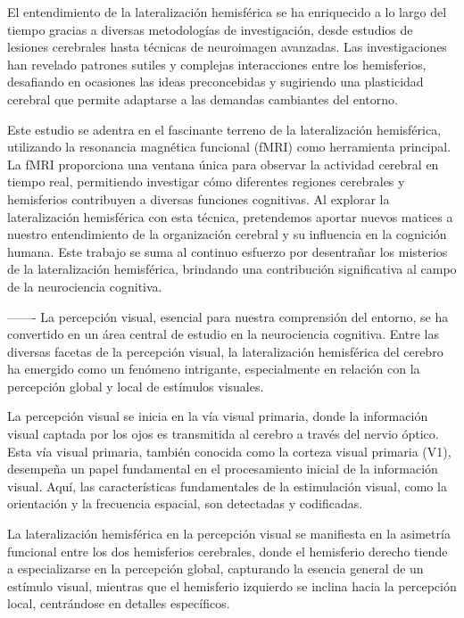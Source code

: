 \documentclass[12pt,oneside]{uhthesis}
\begin{document}
El entendimiento de la lateralización hemisférica se ha enriquecido a lo largo del tiempo gracias a diversas metodologías de investigación, desde estudios de lesiones cerebrales hasta técnicas de neuroimagen avanzadas. Las investigaciones han revelado patrones sutiles y complejas interacciones entre los hemisferios, desafiando en ocasiones las ideas preconcebidas y sugiriendo una plasticidad cerebral que permite adaptarse a las demandas cambiantes del entorno.

Este estudio se adentra en el fascinante terreno de la lateralización hemisférica, utilizando la resonancia magnética funcional (fMRI) como herramienta principal. La fMRI proporciona una ventana única para observar la actividad cerebral en tiempo real, permitiendo investigar cómo diferentes regiones cerebrales y hemisferios contribuyen a diversas funciones cognitivas. Al explorar la lateralización hemisférica con esta técnica, pretendemos aportar nuevos matices a nuestro entendimiento de la organización cerebral y su influencia en la cognición humana. Este trabajo se suma al continuo esfuerzo por desentrañar los misterios de la lateralización hemisférica, brindando una contribución significativa al campo de la neurociencia cognitiva.

-------
La percepción visual, esencial para nuestra comprensión del entorno, se ha convertido en un área central de estudio en la neurociencia cognitiva. Entre las diversas facetas de la percepción visual, la lateralización hemisférica del cerebro ha emergido como un fenómeno intrigante, especialmente en relación con la percepción global y local de estímulos visuales.

La percepción visual se inicia en la vía visual primaria, donde la información visual captada por los ojos es transmitida al cerebro a través del nervio óptico. Esta vía visual primaria, también conocida como la corteza visual primaria (V1), desempeña un papel fundamental en el procesamiento inicial de la información visual. Aquí, las características fundamentales de la estimulación visual, como la orientación y la frecuencia espacial, son detectadas y codificadas.

La lateralización hemisférica en la percepción visual se manifiesta en la asimetría funcional entre los dos hemisferios cerebrales, donde el hemisferio derecho tiende a especializarse en la percepción global, capturando la esencia general de un estímulo visual, mientras que el hemisferio izquierdo se inclina hacia la percepción local, centrándose en detalles específicos.
\end{document}
